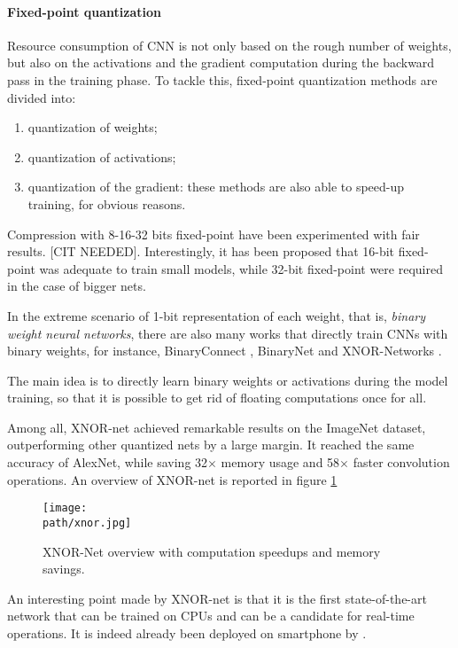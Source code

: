 \paragraph{Fixed-point quantization}
Resource consumption of CNN is not only based on the rough number of weights, but also on the activations and the gradient computation during the backward pass in the training phase. To tackle this, fixed-point quantization methods are divided into:
\begin{enumerate}
    \item quantization of weights; 
    
    \item quantization of activations; 
    
    \item quantization of the gradient: these methods are also able to speed-up training, for obvious reasons. 
\end{enumerate}

Compression with 8-16-32 bits fixed-point have been experimented with fair results. [CIT NEEDED]. Interestingly, it has been proposed that 16-bit fixed-point was adequate to train small models, while 32-bit fixed-point were required in the case of bigger nets.  


In the extreme scenario of 1-bit representation of each weight, that is, \emph{binary weight neural networks}, there are also many works that directly train CNNs with binary weights, for instance, BinaryConnect \parencite{binaryconnect}, BinaryNet \parencite{binarynet} and XNOR-Networks \parencite{XNOR}. 

The main idea is to directly learn binary weights or activations during the model training, so that it is possible to get rid of floating computations once for all. 
\newline 

Among all, XNOR-net achieved remarkable results on the ImageNet dataset, outperforming other quantized nets by a large margin. It reached the same accuracy of AlexNet, while saving 32$\times$ memory usage and 58$\times$ faster convolution operations. An overview of XNOR-net is reported in figure \ref{fig:xnor}

\begin{figure}[h!]
 \centering
 \texttt{[image: \\path/xnor.jpg]} 
 \caption{XNOR-Net overview with computation speedups and memory savings. }
 \label{fig:xnor}
\end{figure}

An interesting point made by XNOR-net is that it is the first state-of-the-art network that can be trained on CPUs and can be a candidate for real-time operations. It is indeed already been deployed on smartphone by \parencite{Wxnor-ai}.


